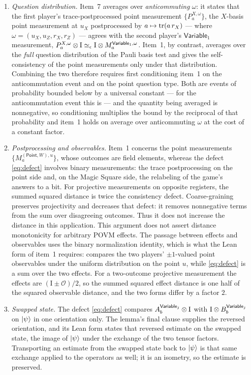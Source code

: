 \documentclass[11pt]{article}
\newcommand{\Id}{\mathrm{I}}
\newcommand{\Variable}{\mathsf{Variable}}
\begin{document}
\begin{enumerate}
  \item \emph{Question distribution.}  Item~7 averages over \emph{anticommuting}
  $\omega$: it states that the first player's trace-postprocessed point
  measurement $\{P^{X,\omega}_a\}$, the $X$-basis point measurement at
  $u_X$ postprocessed by $a \mapsto \mathrm{tr}(a\,r_X)$ --- where
  $\omega = (u_X, u_Z, r_X, r_Z)$ --- agrees with the second
  player's $\Variable_1$ measurement,
  $P^{X,\omega}_a \ot \Id \simeq_\eps \Id \ot M^{\Variable_1,\omega}_a$.
  Item~1, by contrast, averages over the \emph{full} question distribution of
  the Pauli basis test and gives the self-consistency of the point
  measurements only under that distribution.  Combining the two therefore
  requires first conditioning item~1 on the anticommutation event and on the
  point question type.  Both are events of probability bounded below by a
  universal constant --- for the anticommutation event this is
   --- and the quantity being averaged is
  nonnegative, so conditioning multiplies the bound by the reciprocal of that
  probability and item~1 holds on average over anticommuting $\omega$ at the
  cost of a constant factor.
  \item \emph{Postprocessing and observables.}  Item~1 concerns the point
  measurements $\{M^{(\mathsf{Point},W),u}_a\}$, whose outcomes are field
  elements, whereas the defect \eqref{eq:defect} involves binary measurements:
  the trace postprocessing on the point side and, on the Magic Square side, the
  relabeling of the game's answers to a bit. For projective measurements on
  opposite registers, the summed squared distance is twice the consistency
  defect. Coarse-graining preserves projectivity and decreases that defect:
  it removes nonnegative terms from the sum over disagreeing outcomes.
  Thus it does not increase the distance in this application. This argument
  does not assert distance monotonicity for arbitrary POVM effects.
  The passage between effects and observables uses the binary normalization
  identity, which is what the Lean form of
  item~1 requires:  compares
  the two players' $\pm1$-valued point observables under the uniform
  distribution on the point $u$, while \eqref{eq:defect} is a sum over the two
  effects.  For a two-outcome projective measurement the effects are
  $(\Id \pm \mathcal O)/2$, so the summed squared effect distance is one half
  of the squared observable distance, and the two forms differ by a factor
  $2$.
  \item \emph{Swapped state.}  The defect \eqref{eq:defect} compares
  $A^{\Variable_j}_b \ot \Id$ with $\Id \ot B^{\Variable_j}_b$ on $\ket\psi$ in
  one orientation only.  The lemma's final clause supplies the reversed
  orientation, and its Lean form states that reversed estimate on the swapped
  state, the image of $\ket\psi$ under the exchange of the two tensor factors.
  Transporting an estimate from the swapped state back to $\ket\psi$ is that
  same exchange applied to the operators as well; it is an isometry, so the
  estimate is preserved.
\end{enumerate}
\end{document}

